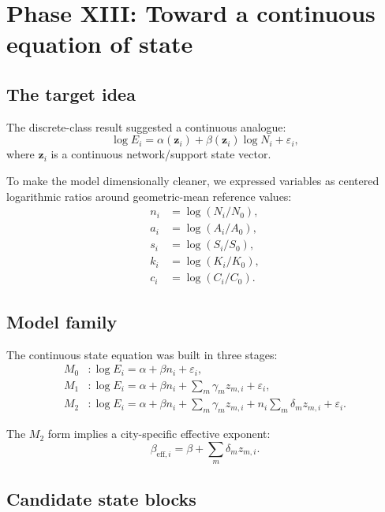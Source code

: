 \documentclass[11pt]{article}
\begin{document}
\section{Phase XIII: Toward a continuous equation of state}

\subsection{The target idea}

The discrete-class result suggested a continuous analogue:
\begin{equation}
\log E_i = \alpha(\mathbf{z}_i) + \beta(\mathbf{z}_i)\log N_i + \varepsilon_i,
\label{eq:state-eq-idea}
\end{equation}
where \(\mathbf{z}_i\) is a continuous network/support state vector.

To make the model dimensionally cleaner, we expressed variables as centered logarithmic ratios around geometric-mean reference values:
\begin{align}
n_i &= \log(N_i/N_0),\\
a_i &= \log(A_i/A_0),\\
s_i &= \log(S_i/S_0),\\
k_i &= \log(K_i/K_0),\\
c_i &= \log(C_i/C_0).
\end{align}

\subsection{Model family}

The continuous state equation was built in three stages:
\begin{align}
M_0 &: \log E_i = \alpha + \beta n_i + \varepsilon_i,\\
M_1 &: \log E_i = \alpha + \beta n_i + \sum_m \gamma_m z_{m,i} + \varepsilon_i,\\
M_2 &: \log E_i = \alpha + \beta n_i + \sum_m \gamma_m z_{m,i}
+ n_i \sum_m \delta_m z_{m,i} + \varepsilon_i.
\label{eq:state-eq}
\end{align}

The \(M_2\) form implies a city-specific effective exponent:
\begin{equation}
\beta_{\mathrm{eff},i}
=
\beta + \sum_m \delta_m z_{m,i}.
\label{eq:beta-eff}
\end{equation}

\subsection{Candidate state blocks}
\end{document}
